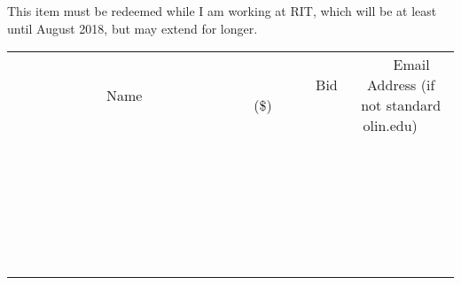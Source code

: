 \documentclass[11pt]{article}
\begin{document}
This item must be redeemed while I am working at RIT, which will be at least until August 2018, but may extend for longer. \\[6ex]
\begin{tabular}{c c c}
~~~~~~~~~~~~~Name~~~~~~~~~~~~~ & ~~~~~~~~~Bid (\$)~~~~~~~~~ & ~~~Email Address (if not standard olin.edu)~~~ \\
 & & \\
\hline
 & & \\
\hline
 & & \\
\hline
 & & \\
\hline
 & & \\
\hline
 & & \\
\hline
 & & \\
\hline
 & & \\
\hline
 & & \\
\hline
 & & \\
\hline
 & & \\
\hline
 & & \\
\hline
 & & \\
\hline
 & & \\
\hline
 & & \\
\hline
 & & \\
\hline
 & & \\
\hline
 & & \\
\hline
 & & \\
\hline
 & & \\
\hline
 & & \\
\hline
 & & \\
\hline
 & & \\
\hline
 & & \\
\hline
 & & \\
\hline
 & & \\
\hline
\end{tabular}
\clearpage
\end{document}
